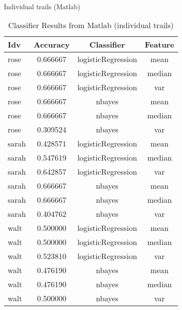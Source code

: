 \begin{frame}{Individual trails (Matlab)} 
   \begin{table}
    \begin{tabular}{l|ccc}
    Idv	    &Accuracy	    &Classifier		    &Feature \\ \hline\hline 
    \rowcolor{blue} rose    &0.666667       &logisticRegression     &mean\\
    \rowcolor{teal} rose    &0.666667       &logisticRegression     &median\\
    \rowcolor{teal} rose    &0.666667       &logisticRegression     &var\\
    \rowcolor{teal} rose    &0.666667       &nbayes &mean\\
    \rowcolor{teal} rose    &0.666667       &nbayes &median\\
    rose    &0.309524       &nbayes &var\\ \hline
    sarah   &0.428571       &logisticRegression     &mean\\ 
    sarah   &0.547619       &logisticRegression     &median\\
    sarah   &0.642857       &logisticRegression     &var\\
    \rowcolor{blue}sarah   &0.666667       &nbayes &mean\\
    \rowcolor{teal} sarah   &0.666667       &nbayes &median\\
    sarah   &0.404762       &nbayes &var\\
    walt    &0.500000       &logisticRegression     &mean\\ \hline
    walt    &0.500000       &logisticRegression     &median\\
    \rowcolor{blue}walt    &0.523810       &logisticRegression     &var\\
    walt    &0.476190       &nbayes &mean\\
    walt    &0.476190       &nbayes &median\\
    walt    &0.500000       &nbayes &var\\
    \end{tabular}
    \caption{Classifier Results from Matlab (individual trails)}
   \end{table}
\end{frame}
